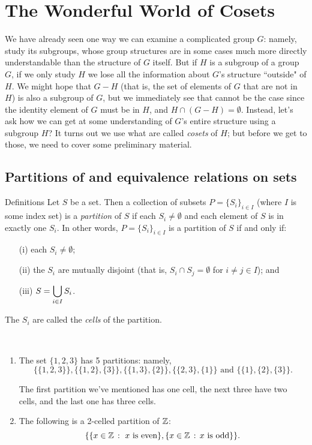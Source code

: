 \chapter{The Wonderful World of Cosets}\label{coslag}%

We have already seen one way we can examine a complicated group $G$:
namely, study its subgroups, whose group structures are in some
cases much more directly understandable than the structure of $G$
itself.  But if $H$ is a subgroup of a group $G$, if we only study
$H$ we lose all the information about $G$'s structure ``outside" of
$H$.  We might hope that $G-H$ (that is, the set of elements of $G$
that are not in $H$) is also a subgroup of $G$, but we immediately
see that cannot be the case since the identity element of $G$ must
be in $H$, and $H\cap (G-H)=\emptyset$.  Instead, let's ask how we
can get at some understanding of $G$'s entire structure using a
subgroup $H$?  It turns out we use what are called \textit{cosets} of
$H$; but before we get to those, we need to cover some preliminary
material.

\section{Partitions of and equivalence relations
on sets}

\begin{df}{Definitions} Let $S$ be a set.  Then a collection of subsets
$P=\{S_i\}_{i\in I}$ (where $I$ is some index set) is a \textit{partition} of $S$ if each $S_i \neq \emptyset$ and each element
of $S$ is in exactly one $S_i$.  In other words,
$P=\{S_i\}_{i\in I}$ is a partition of $S$ if and only if:
\begin{center}
\parbox{3in}{
\begin{enumerate}
\item[(i)] each $S_i\neq \emptyset$;
\item[(ii)] the $S_i$ are mutually disjoint (that is, $S_i\cap S_j =
\emptyset$ for $i\neq j \in I$); and
\item[(iii)] $\displaystyle{S=\bigcup_{i\in I}S_i}$.
\end{enumerate}}\end{center}

\noindent The $S_i$ are called the \textit{cells} of the partition.
\end{df}

\begin{example}{}\ \begin{enumerate}
\item The set $\{1,2,3\}$ has 5 partitions: namely,
$$\{\{1,2,3\}\},\{\{1,2\},\{3\}\}, \{\{1,3\},\{2\}\},\{\{2,3\},\{1\}\} \mbox{ and } \{\{1\},\{2\},\{3\}\}.$$

The first partition we've mentioned has one cell, the next three have
two cells, and the last one has three cells.

\item The following is a 2-celled partition of $\mathbb{Z}$: $$\{\{x\in \mathbb{Z}\,:\ x \mbox{
is even}\},\{x\in \mathbb{Z}\,:\, x\mbox{ is odd}\}\}. $$
\end{enumerate}
\end{example}

